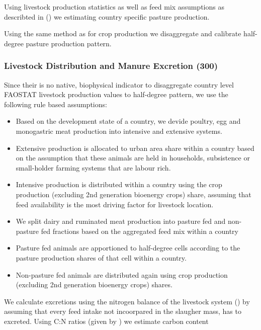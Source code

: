 \documentclass[gc, manuscript]{copernicus}
\begin{document}
Using livestock production statistics as well as feed mix assumptions as
describted in (\citep{weindl}) we estimating country specific pasture
production.

Using the same method as for crop production we disaggregate and
calibrate half-degree pasture production pattern.

\subsubsection{Livestock Distribution and Manure Excretion (300)}

Since their is no native, biophysical indicator to disaggregate country
level FAOSTAT livestock production values to half-degree pattern, we use
the following rule based assumptions:

\begin{itemize}
\item
  Based on the development state of a country, we devide poultry, egg
  and monogastric meat production into intensive and extensive systems.
\item
  Extensive production is allocated to urban area share within a country
  based on the assumption that these animals are held in households,
  subsistence or small-holder farming systems that are labour rich.
\item
  Intensive production is distributed within a country using the crop
  production (excluding 2nd generation bioenergy crops) share, assuming
  that feed availability is the most driving factor for livestock
  location.
\item
  We split dairy and ruminated meat production into pasture fed and
  non-pasture fed fractions based on the aggregated feed mix within a
  country
\end{itemize}

\begin{itemize}
\item
  Pasture fed animals are apportioned to half-degree cells according to
  the pasture production shares of that cell within a country.
\item
  Non-pasture fed animals are distributed again using crop production
  (excluding 2nd generation bioenergy crops) shares.
\end{itemize}

We calculate excretions using the nitrogen balance of the livestock
system (\citep{bodirsky1012}) by assuming that every feed intake not
incoorpared in the slaugher mass, has to excreted. Using C:N ratios
(given by \citep[(][]{ipcc_2019_2019}) we estimate carbon content
\end{document}
